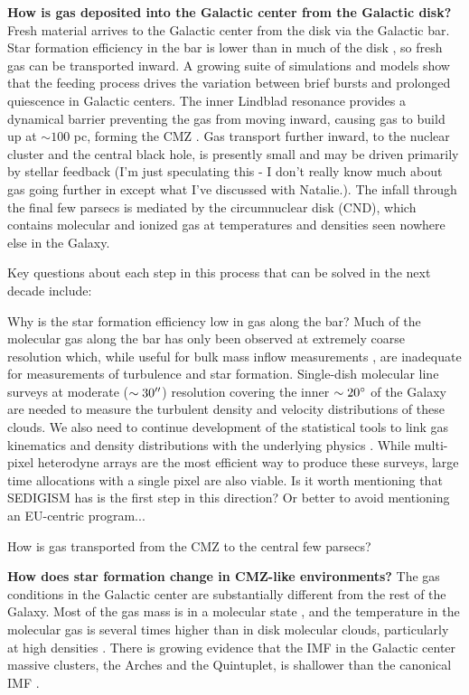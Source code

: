 \documentclass{aastex62}
\def\agnote#1{{\color{red}#1}}
\begin{document}
\textbf{How is gas deposited into the Galactic center from the Galactic disk?}
Fresh material arrives to the Galactic center from the disk via the Galactic bar.
Star formation efficiency in the bar is lower than in much of the disk
\citep[e.g.][]{Rieko2018a}, so fresh gas can be transported inward.
A growing suite of simulations and models
\citep{Krumholz2015a,Sormani2015a,Torrey2016a,Ridley2017a,Krumholz2017a,Sormani2018a,Jeffreson2018a}
show that the feeding process drives the variation between brief bursts and
prolonged quiescence in Galactic centers.  The inner Lindblad resonance provides
a dynamical barrier preventing the gas from moving inward, causing gas to build
up at $\sim100$ pc, forming the CMZ \citep{Krumholz2015a}.  Gas transport further
inward, to the nuclear cluster and the central black hole, is presently small
and may be driven primarily by stellar feedback \agnote{(I'm just speculating
this - I don't really know much about gas going further in except what I've
discussed with Natalie.)}.  The infall through the final few parsecs
is mediated by the circumnuclear disk (CND), which contains molecular and ionized
gas at temperatures and densities seen nowhere else in the Galaxy.


Key questions about each step in this process that can be solved in the next
decade include:

Why is the star formation efficiency low in gas along the bar?
Much of the molecular gas along the bar has only been observed at extremely
coarse resolution which, while useful for bulk mass inflow measurements
\citep[e.g.][]{Sormani2019a}, are inadequate for measurements of turbulence and
star formation.  Single-dish molecular line surveys at moderate
($\sim30\mbox{$^{\prime\prime}$}$) resolution covering the inner $\sim20^{\circ}$ of the Galaxy are
needed to measure the turbulent density and velocity distributions of these
clouds.  We also need to continue development of the statistical tools to link gas kinematics and
density distributions with the underlying physics
\citep{Koch2017a,Burkhart2018a}. While multi-pixel heterodyne arrays are the
most efficient way to produce these surveys, large time allocations with a
single pixel are also viable.  \agnote{Is it worth mentioning that SEDIGISM has
is the first step in this direction?  Or better to avoid mentioning an
EU-centric program...}

How is gas transported from the CMZ to the central few parsecs?


\textbf{How does star formation change in CMZ-like environments?}
The gas conditions in the Galactic center are substantially different from the rest of the Galaxy.
Most of the gas mass is in a molecular state \citep{}, and the temperature in the molecular gas is several times
higher than in disk molecular clouds, particularly at high densities \citep{Ao2013a,Ginsburg2016a,Krieger2017a}.
There is growing evidence that the IMF in the Galactic center massive clusters, the Arches and the Quintuplet,
is shallower than the canonical IMF \citep{Hosek2018a}.
\end{document}
